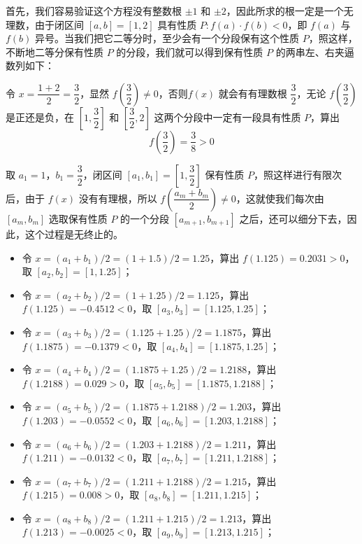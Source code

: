 首先，我们容易验证这个方程没有整数根 $\pm 1$ 和 $\pm 2$，因此所求的根一定是一个无理数，由于闭区间 $[a,b]=[1,2]$ 具有性质 $P:f(a)\cdot f(b)<0$，即 $f(a)$ 与$f(b)$ 异号。当我们把它二等分时，至少会有一个分段保有这个性质 $P$，照这样，不断地二等分保有性质 $P$ 的分段，我们就可以得到保有性质 $P$ 的两串左、右夹逼数列如下：

令 $x=\dfrac{1+2}{2}=\dfrac{3}{2}$，显然 $f\left(\dfrac{3}{2}\right)\ne 0$，否则$f(x)$ 就会有有理数根 $\dfrac{3}{2}$，无论 $f\left(\dfrac{3}{2}\right)$ 是正还是负，在 $\left[1,\dfrac{3}{2}\right]$ 和 $\left[\dfrac{3}{2},2\right]$ 这两个分段中一定有一段具有性质 $P$，算出
\[f\left(\frac{3}{2}\right)=\frac{3}{8}>0\]

取 $a_1=1$，$b_1=\dfrac{3}{2}$，闭区间 $[a_1,b_1]=\left[1,\dfrac{3}{2}\right]$ 保有性质 $P$，照这样进行有限次后，由于 $f(x)$ 没有有理根，所以 $f\left(\dfrac{a_m+b_m}{2}\right)\ne 0$，这就使我们每次由 $[a_m,b_m]$ 选取保有性质 $P$ 的一个分段 $[a_{m+1},b_{m+1}]$ 之后，还可以细分下去，因此，这个过程是无终止的。
\begin{itemize}%
\item 令 $x=(a_1+b_1)/2=(1+1.5)/2=1.25$，算出 $f(1.125)=0.2031>0$，取 $[a_2,b_2]=[1,1.25]$；
\item 令 $x=(a_2+b_2)/2=(1+1.25)/2=1.125$，算出 $f(1.125)=-0.4512<0$，取 $[a_3,b_3]=\left[1.125,1.25\right]$；
\item 令 $x=(a_3+b_3)/2=(1.125+1.25)/2=1.1875$，算出 $f\left(1.1875\right)=-0.1379<0$，取 $[a_4,b_4]=\left[1.1875,1.25\right]$；
\item 令 $x=(a_4+b_4)/2=(1.1875+1.25)/2=1.2188$，算出 $f\left(1.2188\right)=0.029>0$，取 $[a_5,b_5]=\left[1.1875,1.2188\right]$；
\item 令 $x=(a_5+b_5)/2=(1.1875+1.2188)/2=1.203$，算出 $f\left(1.203\right)=-0.0552<0$，取 $[a_6,b_6]=\left[1.203,1.2188\right]$；
\item 令 $x=(a_6+b_6)/2=(1.203+1.2188)/2=1.211$，算出 $f\left(1.211\right)=-0.0132<0$，取 $[a_7,b_7]=\left[1.211,1.2188\right]$；
\item 令 $x=(a_7+b_7)/2=(1.211+1.2188)/2=1.215$，算出 $f\left(1.215\right)=0.008>0$，取 $[a_8,b_8]=\left[1.211,1.215\right]$；
\item 令 $x=(a_8+b_8)/2=(1.211+1.215)/2=1.213$，算出 $f\left(1.213\right)=-0.0025<0$，取 $[a_9,b_9]=\left[1.213,1.215\right]$；
\end{itemize}

